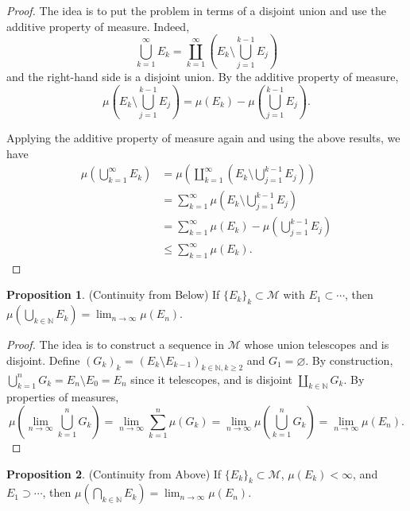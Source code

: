 \documentclass[12pt, reqno]{amsart}
\numberwithin{equation}{section}
\theoremstyle{definition}
\newtheorem*{proposition*}{Proposition}
\theoremstyle{definition}
\newcommand{\N}{\mathbb{N}}
\let\emptyset\varnothing
\newcommand{\intersect}{\bigcap}
\newcommand{\union}{\bigcup}
\newcommand{\disjointunion}{\coprod}
\begin{document}
\begin{proof}
The idea is to put the problem in terms of a disjoint union and use the additive property of measure.
Indeed,
\[
\union_{k = 1}^\infty E_k = \coprod_{k = 1}^\infty \left( E_k \setminus \union_{j = 1}^{k - 1} E_j \right)
\]
and the right-hand side is a disjoint union.
By the additive property of measure,
\[
\mu \left( E_k \setminus \union_{j = 1}^{k - 1} E_j \right) = \mu(E_k) - \mu \left(\union_{j = 1}^{k - 1} E_j \right).
\]

Applying the additive property of measure again and using the above results, we have
\begin{align*}
\mu \left( \union_{k = 1}^\infty E_k \right)
&= \mu \left( \coprod_{k = 1}^\infty \left( E_k \setminus \union_{j = 1}^{k - 1} E_j \right) \right) \\
&= \sum_{k = 1}^\infty \mu \left( E_k \setminus \union_{j = 1}^{k - 1} E_j \right) \\
&= \sum_{k = 1}^\infty \mu(E_k ) - \mu \left( \union_{j = 1}^{k - 1} E_j \right) \\
&\le \sum_{k = 1}^\infty \mu(E_k ).
\end{align*}

\end{proof}

\begin{proposition*}
(Continuity from Below)
If $\{ E_k \}_k \subset \mathcal{M}$ with $E_1 \subset \cdots$,
then $\mu(\union_{k\in\N} E_k) = \lim_{n \to \infty} \mu(E_n)$.
\end{proposition*}

\begin{proof}
The idea is to construct a sequence in $\mathcal{M}$ whose union telescopes and is disjoint.
Define $(G_k)_k$  = $(E_k \setminus E_{k - 1})_{k \in \N, k \ge 2}$ and $G_1 = \emptyset$.
By construction, $\union_{k = 1}^n G_k = E_n \setminus E_0 = E_n$ since it telescopes, and is disjoint $\disjointunion_{k \in \N} G_k$.
By properties of measures,
$$
\mu(\lim_{n \to \infty} \union_{k = 1}^n G_k)
= \lim_{n \to \infty} \sum_{k = 1}^n \mu(G_k)
= \lim_{n \to \infty} \mu(\union_{k = 1}^n G_k)
= \lim_{n \to \infty} \mu(E_n).
$$
\end{proof}

\begin{proposition*}
(Continuity from Above) 
If $\{ E_k \}_k \subset \mathcal{M}$,
$\mu(E_k) < \infty$,
and $E_1 \supset \cdots$,
then $\mu(\intersect_{k\in\N} E_k) = \lim_{n \to \infty} \mu(E_n)$.
\end{proposition*}
\end{document}
